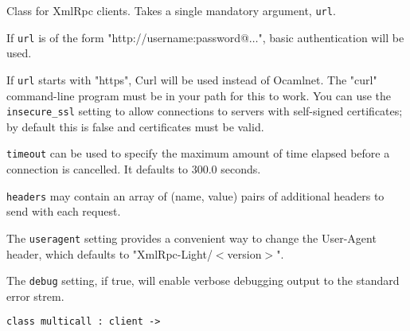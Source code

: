 \documentclass[11pt]{article}
\begin{document}
\begin{ocamldocdescription}
Class for XmlRpc clients. Takes a single mandatory argument, {\tt{url}}.


    If {\tt{url}} is of the form "http://username:password@$\ldots$", basic
    authentication will be used.


    If {\tt{url}} starts with "https", Curl will be used instead of Ocamlnet.
    The "curl" command-line program must be in your path for this to work.
    You can use the {\tt{insecure\_ssl}} setting to allow connections to servers
    with self-signed certificates; by default this is false and certificates
    must be valid.


    {\tt{timeout}} can be used to specify the maximum amount of time
    elapsed before a connection is cancelled. It defaults to 300.0 seconds.


    {\tt{headers}} may contain an array of (name, value) pairs of additional
    headers to send with each request.


    The {\tt{useragent}} setting provides a convenient way to change the
    User-Agent header, which defaults to "XmlRpc-Light/$<$version$>$".


    The {\tt{debug}} setting, if true, will enable verbose debugging output to
    the standard error strem.


\end{ocamldocdescription}




\begin{ocamldoccode}
{\tt{class multicall : }}{\tt{client -> }}\end{ocamldoccode}
\label{class:XmlRpc.multicall}
\end{document}
